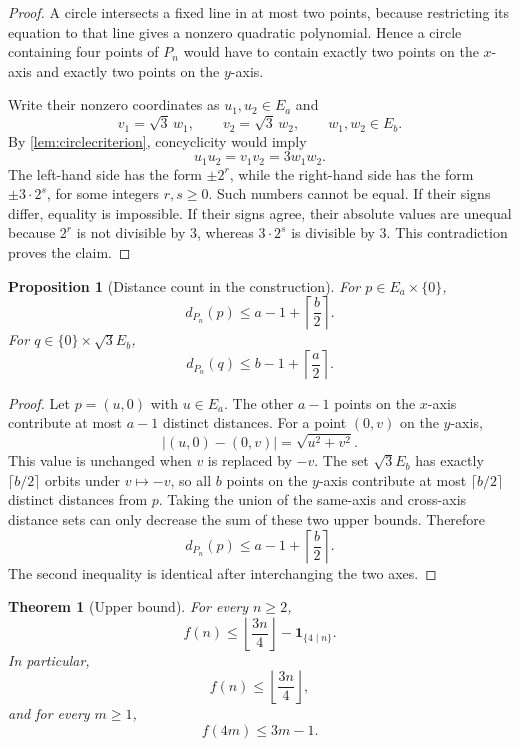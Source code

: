 \documentclass[11pt]{article}
\newtheorem{theorem}{Theorem}[section]
\newtheorem{proposition}[proposition]{Proposition}
\theoremstyle{definition}
\theoremstyle{remark}
\newcommand{\ind}{\mathbf{1}}
\begin{document}
\begin{proof}
A circle intersects a fixed line in at most two points, because restricting its equation to that line gives a nonzero quadratic polynomial.  Hence a circle containing four points of $P_n$ would have to contain exactly two points on the $x$-axis and exactly two points on the $y$-axis.

Write their nonzero coordinates as $u_1,u_2\in E_a$ and
\[
 v_1=\sqrt3\,w_1,\qquad v_2=\sqrt3\,w_2,
 \qquad w_1,w_2\in E_b.
\]
By \cref{lem:circlecriterion}, concyclicity would imply
\[
 u_1u_2=v_1v_2=3w_1w_2.
\]
The left-hand side has the form $\pm2^r$, while the right-hand side has the form $\pm3\cdot2^s$, for some integers $r,s\ge0$.  Such numbers cannot be equal.  If their signs differ, equality is impossible.  If their signs agree, their absolute values are unequal because $2^r$ is not divisible by $3$, whereas $3\cdot2^s$ is divisible by $3$.  This contradiction proves the claim.
\end{proof}

\begin{proposition}[Distance count in the construction]\label{prop:count}
For $p\in E_a\times\{0\}$,
\[
 d_{P_n}(p)\le a-1+\left\lceil\frac b2\right\rceil.
\]
For $q\in\{0\}\times\sqrt3 E_b$,
\[
 d_{P_n}(q)\le b-1+\left\lceil\frac a2\right\rceil.
\]
\end{proposition}

\begin{proof}
Let $p=(u,0)$ with $u\in E_a$.  The other $a-1$ points on the $x$-axis contribute at most $a-1$ distinct distances.  For a point $(0,v)$ on the $y$-axis,
\[
 |(u,0)-(0,v)|=\sqrt{u^2+v^2}.
\]
This value is unchanged when $v$ is replaced by $-v$.  The set $\sqrt3 E_b$ has exactly $\lceil b/2\rceil$ orbits under $v\mapsto-v$, so all $b$ points on the $y$-axis contribute at most $\lceil b/2\rceil$ distinct distances from $p$.  Taking the union of the same-axis and cross-axis distance sets can only decrease the sum of these two upper bounds.  Therefore
\[
 d_{P_n}(p)\le a-1+\left\lceil\frac b2\right\rceil.
\]
The second inequality is identical after interchanging the two axes.
\end{proof}

\begin{theorem}[Upper bound]\label{thm:upper}
For every $n\ge2$,
\[
 f(n)\le
 \left\lfloor\frac{3n}{4}\right\rfloor-
 \ind_{\{4\mid n\}}.
\]
In particular,
\[
 f(n)\le\left\lfloor\frac{3n}{4}\right\rfloor,
\]
and for every $m\ge1$,
\[
 f(4m)\le3m-1.
\]
\end{theorem}
\end{document}
